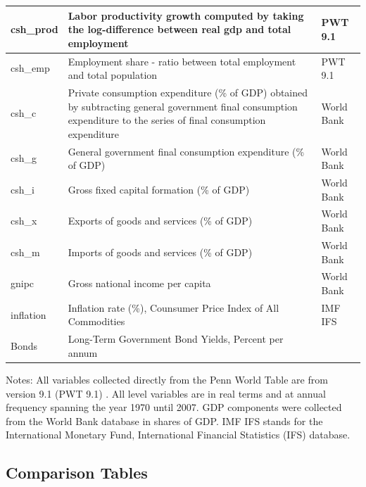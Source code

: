 \documentclass[12pt]{article}
\newcommand{\annote}[1]{\parbox{\textwidth}{\renewcommand{\baselinestretch}{1.0}\vspace{12pt} \small Notes: #1}}
\begin{document}
\begin{appendices}
\begin{table}[!htbp]
\begin{tabular}{p{2cm}p{9cm}p{3.5cm}}
 csh\_prod & Labor productivity growth computed by taking the log-difference between real gdp and total employment & PWT 9.1 \\ \hline
 csh\_emp & Employment share - ratio between total employment and total population & PWT 9.1 \\ \hline
 csh\_c & Private consumption expenditure (\% of GDP) obtained by subtracting general government final consumption expenditure to the series of final consumption expenditure & World Bank \\ \hline
 csh\_g & General government final consumption expenditure (\% of GDP) & World Bank \\ \hline
 csh\_i & Gross fixed capital formation (\% of GDP) & World Bank \\ \hline
 csh\_x & Exports of goods and services (\% of GDP) & World Bank \\ \hline
 csh\_m & Imports of goods and services (\% of GDP) & World Bank \\ \hline
 gnipc &  Gross national income per capita & World Bank \\ \hline
 inflation & Inflation rate (\%), Counsumer Price Index of All Commodities& IMF IFS \\ \hline
 Bonds & Long-Term Government Bond Yields, Percent per annum & \cite{Arvai2023} \\ \hline
 
 \hline 
\end{tabular}
\annote{All variables collected directly from the Penn World Table are from version 9.1 (PWT 9.1) \cite{Feenstra2015}. All level variables are in real terms and at annual frequency spanning the year 1970 until 2007. GDP components were collected from the World Bank database in shares of GDP. IMF IFS stands for the International Monetary Fund, International Financial Statistics (IFS) database.}
\end{table}

\clearpage
\subsection{Comparison Tables}

\vspace{-1.5em}


\end{appendices}
\end{document}
